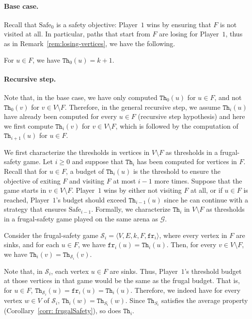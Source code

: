 \documentclass{theoretics}
\newcommand{\PO}{Player~$1$\xspace}
\newcommand{\G}{{\mathcal G}}
\renewcommand{\S}{{\mathcal S}}
\newcommand{\fr}{\texttt{fr}}
\newcommand{\notF}{V \setminus F}
\newcommand{\thresh}{\texttt{Th}\xspace}
\newcommand{\safe}{\text{Safe}}
\newcommand{\zug}[1]{\langle #1  \rangle}
\begin{document}
\paragraph*{Base case.}
Recall that $\safe_0$ is a safety objective: \PO wins by ensuring that $F$ is not visited at all. In particular, paths that start from $F$ are losing for \PO, thus as in Remark~\ref{rem:losing-vertices}, we have the following.

\begin{lemma}
For $u \in F$, we have $\thresh_0(u) = k+1$. 
\end{lemma}

\paragraph*{Recursive step.}

Note that, in the base case, we have only computed \(\thresh_0(u)\) for \(u \in F\), and not \(\thresh_0(v)\) for \(v \in V \setminus F\). 
Therefore, in the general recursive step, we assume \(\thresh_i(u)\) have already been computed for every \(u \in F\) (recursive step hypothesis) and here we first compute \(\thresh_i(v)\) for \(v \in V \setminus F\), which is followed by the computation of \(\thresh_{i+1}(u)\) for \(u \in F\). 
 
We first characterize the thresholds in vertices in $\notF$ as thresholds in a frugal-safety game. 
Let $i \geq 0$ and suppose that $\thresh_i$ has been computed for vertices in $F$. Recall that for $u \in F$, a budget of $\thresh_i(u)$ is the threshold to ensure the objective of exiting $F$ and visiting $F$ at most $i-1$ more times. Suppose that the game starts in $v \in \notF$. \PO wins by either not visiting $F$ at all, or if $u \in F$ is reached, \PO's budget should exceed $\thresh_{i-1}(u)$ since he can continue with a strategy that ensures $\safe_{i-1}$. Formally, we characterize $\thresh_i$ in $\notF$ as thresholds in a frugal-safety game played on the same arena as $\G$. 

\begin{lemma}\label{lem: frugalsafetytoSafei}
Consider the frugal-safety game $\S_i = \zug{V, E, k, F, \fr_i}$, where every vertex in \(F\) are sinks, and for each $u \in F$, we have $\fr_i(u) = \thresh_{i}(u)$. 
Then, for every $v \in \notF$, we have $\thresh_i(v) = \thresh_{\S_i}(v)$. 
\end{lemma}

\begin{remark}\label{rem: averagepropertyinherit}
	Note that, in \(\S_i\), each vertex \(u \in F\) are sinks. Thus, \PO's threshold budget at those vertices in that game would be the same as the frugal budget. That is, for \(u \in F\), \(\thresh_{\S_i}(u) = \fr_i(u) = \thresh_i(u)\). Therefore, we indeed have for every vertex \(w \in V\) of \(\S_i\), \(\thresh_i(w) = \thresh_{S_i}(w)\). 
	Since \(\thresh_{S_i}\) satisfies the average property (Corollary~\ref{corr: frugalSafety}), so does \(\thresh_i\). 
\end{remark}
\end{document}
